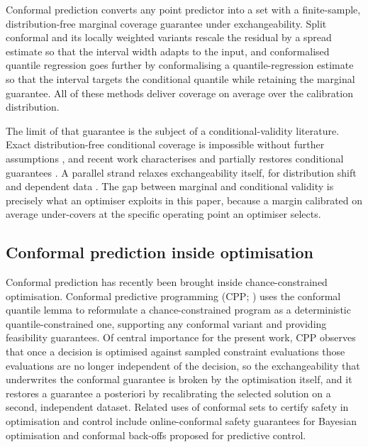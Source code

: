 \documentclass[review,times]{elsarticle}
\begin{document}
Conformal prediction \citep{vovk2005,angelopoulos2023} converts any point predictor into a
set with a finite-sample, distribution-free marginal coverage guarantee under
exchangeability. Split conformal and its locally weighted variants \citep{lei2018} rescale
the residual by a spread estimate so that the interval width adapts to the input, and
conformalised quantile regression \citep{romano2019} goes further by conformalising a
quantile-regression estimate so that the interval targets the conditional quantile while
retaining the marginal guarantee. All of these methods deliver coverage on average over the
calibration distribution.

The limit of that guarantee is the subject of a conditional-validity literature. Exact
distribution-free conditional coverage is impossible without further assumptions
\citep{vovk2012,leiwasserman2014}, and recent work characterises and partially restores
conditional guarantees \citep{gibbscherian2023}. A parallel strand relaxes exchangeability
itself, for distribution shift and dependent data
\citep{tibshirani2019,barber2023,gibbs2021}. The gap between marginal and conditional
validity is precisely what an optimiser exploits in this paper, because a margin calibrated
on average under-covers at the specific operating point an optimiser selects.

\subsection{Conformal prediction inside optimisation}

Conformal prediction has recently been brought inside chance-constrained optimisation.
Conformal predictive programming (CPP; \citealt{zhao2024cpp}) uses the conformal quantile
lemma to reformulate a chance-constrained program as a deterministic quantile-constrained
one, supporting any conformal variant and providing feasibility guarantees. Of central
importance for the present work, CPP observes that once a decision is optimised against
sampled constraint evaluations those evaluations are no longer independent of the decision,
so the exchangeability that underwrites the conformal guarantee is broken by the optimisation
itself, and it restores a guarantee a posteriori by recalibrating the selected solution on a
second, independent dataset. Related uses of conformal sets to certify safety in optimisation
and control include online-conformal safety guarantees for Bayesian optimisation
\citep{zhang2024} and conformal back-offs proposed for predictive control.
\end{document}

